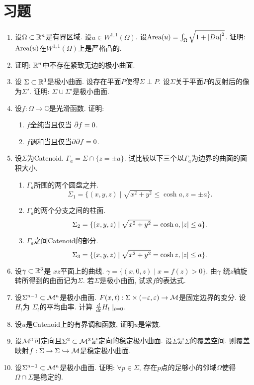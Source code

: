 \chapter{习题}
\begin{enumerate}
    \item 设$\Omega\subset \mathbb{R}^n$是有界区域. 设$u \in W^{1,1}(\Omega)$.  设$\text{Area}(u)=\int_\Omega \sqrt{1+\left | Du \right |^2}$. 证明: $\text{Area}(u)$在$W^{1,1}(\Omega)$上是严格凸的.
    \item 证明: $\mathbb{R}^n$中不存在紧致无边的极小曲面.
    \item 设 $\Sigma \subset \mathbb{R}^3$是极小曲面. 设存在平面$P$使得$\Sigma \perp P$. 设$\Sigma$关于平面$P$的反射后的像为$\Sigma'$. 证明: $\Sigma \cup \Sigma'$是极小曲面.
    \item 设$f: \Omega \to \mathbb{C}$是光滑函数. 证明:
    \begin{enumerate}
        \item $f$全纯当且仅当 ${\bar{\partial}} f=0$.
        \item $f$调和当且仅当$\partial {\bar{\partial}} f=0$.
    \end{enumerate}
    \item 设$\Sigma$为Catenoid. $\Gamma_a=\Sigma \cap \{z=\pm a\}$. 试比较以下三个以$\Gamma_a$为边界的曲面的面积大小.
    \begin{enumerate}
        \item $\Gamma_a$所围的两个圆盘之并.  
        \begin{equation*}
            \Sigma_1=\{(x,y,z)\mid \sqrt{x^2+y^2} \le \cosh a, z=\pm a\}.
        \end{equation*}
        \item $\Gamma_a$的两个分支之间的柱面. 
        \begin{equation*}
            \Sigma_2=\{(x,y,z)\mid \sqrt{x^2+y^2} = \cosh a, \left | z \right | \le a\}.
        \end{equation*}
        \item $\Gamma_a$之间Catenoid的部分. 
        \begin{equation*}
            \Sigma_3=\{(x,y,z)\mid  \sqrt{x^2+y^2}=\cosh z, \left | z \right | \le a \}.
        \end{equation*}
    \end{enumerate}
    \item 设$\gamma\subset \mathbb{R}^3$是 $xz$平面上的曲线. $\gamma= \{(x,0,z)\mid x=f(z) >0 \}$. 由$\gamma$ 绕$z$轴旋转所得到的曲面记为$\Sigma$. 若$\Sigma$是极小曲面, 试求$f$的表达式.
    \item 设$\Sigma^{n-1} \subset {\mathcal{M}}^n$是极小曲面. $F(x,t): \Sigma \times (-\varepsilon, \varepsilon)\to {\mathcal{M}}$是固定边界的变分. 设$H_t$为 $\Sigma_t$的平均曲率. 计算 $\frac{d}{dt} H_t \mid _{t=0}$.
    \item 设$u$是Catenoid上的有界调和函数, 证明$u$是常数.
    \item 设${\mathcal{M}}^3$可定向且$\Sigma^2 \subset {\mathcal{M}}^3$是定向的稳定极小曲面. 设$\tilde{\Sigma}$是$\Sigma$的覆盖空间. 则覆盖映射$f:\tilde{\Sigma}\to \Sigma \hookrightarrow {\mathcal{M}}$是稳定极小曲面.
    \item 设$\Sigma^{n-1} \subset {\mathcal{M}}^n$是极小曲面. 证明: $\forall p \in \Sigma$, 存在$p$点的足够小的邻域$\Omega$使得$\Omega \cap \Sigma$是稳定的.
\end{enumerate}